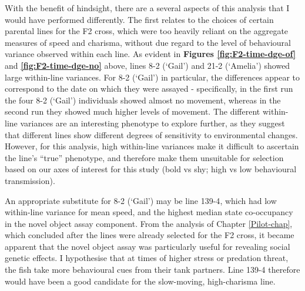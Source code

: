 \documentclass[
]{book}
\begin{document}
With the benefit of hindsight, there are a several aspects of this analysis that I would have performed differently. The first relates to the choices of certain parental lines for the F2 cross, which were too heavily reliant on the aggregate measures of speed and charisma, without due regard to the level of behavioural variance observed within each line. As evident in \textbf{Figures \ref{fig:F2-time-dge-of}} and \textbf{\ref{fig:F2-time-dge-no}} above, lines \textcolor{8-2 (‘Gail’)_FF699C}{8-2 (‘Gail’)} and \textcolor{21-2 (‘Amelia’)_49B500}{21-2 (‘Amelia’)} showed large within-line variances. For \textcolor{8-2 (‘Gail’)_FF699C}{8-2 (‘Gail’)} in particular, the differences appear to correspond to the date on which they were assayed - specifically, in the first run the four \textcolor{8-2 (‘Gail’)_FF699C}{8-2 (‘Gail’)} individuals showed almost no movement, whereas in the second run they showed much higher levels of movement. The different within-line variances are an interesting phenotype to explore further, as they suggest that different lines show different degrees of sensitivity to environmental changes. However, for this analysis, high within-line variances make it difficult to ascertain the line's ``true'' phenotype, and therefore make them unsuitable for selection based on our axes of interest for this study (bold vs shy; high vs low behavioural transmission).

An appropriate substitute for \textcolor{8-2 (‘Gail’)_FF699C}{8-2 (‘Gail’)} may be line \textcolor{139-4_FF61CC}{139-4}, which had low within-line variance for mean speed, and the highest median state co-occupancy in the novel object assay component. From the analysis of Chapter \ref{Pilot-chap}, which concluded after the lines were already selected for the F2 cross, it became apparent that the novel object assay was particularly useful for revealing social genetic effects. I hypothesise that at times of higher stress or predation threat, the fish take more behavioural cues from their tank partners. Line \textcolor{139-4_FF61CC}{139-4} therefore would have been a good candidate for the slow-moving, high-charisma line.
\end{document}
